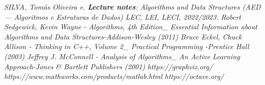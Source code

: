\begin{thebibliography}{9}
\vspace{5mm} %

\textit{SILVA, Tomás Oliveira e. \textbf{Lecture notes}: Algorithms and Data Structures (AED — Algoritmos e Estruturas de Dados) LEC, LEI, LECI, 2022/2023.}
\textit{Robert Sedgewick, Kevin Wayne - Algorithms, 4th Edition\_ Essential Information about Algorithms and Data Structures-Addison-Wesley (2011)}
\textit{Bruce Eckel, Chuck Allison - Thinking in C++, Volume 2\_ Practical Programming -Prentice Hall (2003)}
\textit{Jeffrey J. McConnell - Analysis of Algorithms\_ An Active Learning Approach-Jones & Bartlett Publishers (2001)}
\textit{https://graphviz.org/} 
\textit{https://www.mathworks.com/products/matlab.html} 
\textit{https://octave.org/} 


\end{thebibliography}




